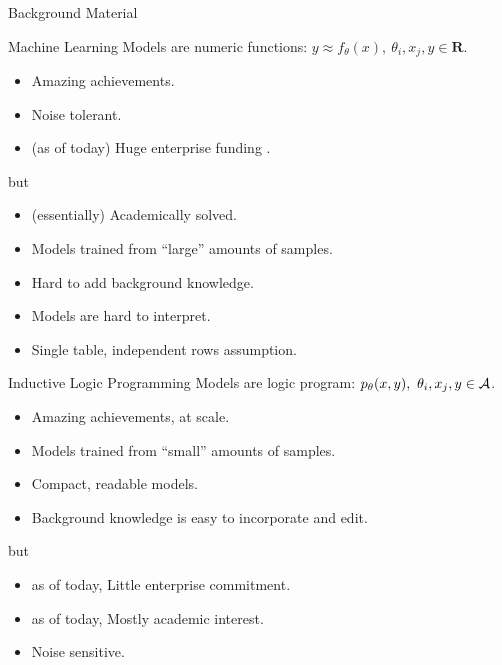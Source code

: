 \documentclass[bigger]{beamer}
\begin{document}
    \begin{frame}
        \Huge Background Material
    \end{frame}

    \begin{frame}{Machine Learning}
        Models are numeric functions: $y \approx f_\theta(x),~\theta_i, x_j, y\in\mathbf{R}$.
        \begin{itemize}
            \item Amazing achievements.
            \item Noise tolerant.
            \item (as of today) Huge enterprise funding .
        \end{itemize}
        but
        \begin{itemize}
            \item (essentially) Academically solved.
            \item Models trained from ``large'' amounts of samples.
            \item Hard to add background knowledge.
            \item Models are hard to interpret.
            \item Single table, independent rows assumption.
        \end{itemize}
    \end{frame}
    
    \begin{frame}{Inductive Logic Programming}
        Models are logic program: $p_\theta(x, y),~\theta_i, x_j, y\in{\cal A}$.
        \begin{itemize}
            \item Amazing achievements, at scale.
            \item Models trained from ``small'' amounts of samples.
            \item Compact, readable models.
            \item Background knowledge is easy to incorporate and edit.
        \end{itemize}
        but
        \begin{itemize}
            \item as of today, Little enterprise commitment.
            \item as of today, Mostly academic interest.
            \item Noise sensitive.
        \end{itemize}
    \end{frame}
\end{document}
